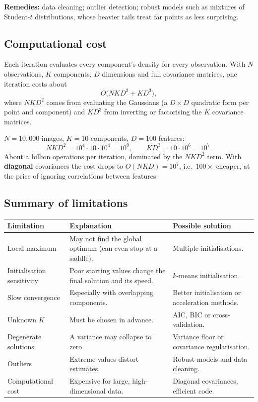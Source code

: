 \documentclass[11pt,a4paper]{article}
\begin{document}
\textbf{Remedies:} data cleaning; outlier detection; robust models such as mixtures of Student-$t$ distributions, whose heavier tails treat far points as less surprising.

\subsection{Computational cost}

Each iteration evaluates every component's density for every observation. With $N$ observations, $K$ components, $D$ dimensions and full covariance matrices, one iteration costs about
\[
O\big(NKD^2+KD^3\big),
\]
where $NKD^2$ comes from evaluating the Gaussians (a $D\times D$ quadratic form per point and component) and $KD^3$ from inverting or factorising the $K$ covariance matrices.

\begin{example}
$N=10{,}000$ images, $K=10$ components, $D=100$ features:
\[
NKD^2=10^4\cdot10\cdot10^4=10^9,\qquad KD^3=10\cdot10^6=10^7.
\]
About a billion operations per iteration, dominated by the $NKD^2$ term. With \textbf{diagonal} covariances the cost drops to $O(NKD)=10^7$, i.e.\ $100\times$ cheaper, at the price of ignoring correlations between features.
\end{example}

\subsection{Summary of limitations}

\begin{center}
\renewcommand{\arraystretch}{1.2}
\begin{tabular}{@{}p{3.1cm}p{6cm}p{5.6cm}@{}}
\toprule
Limitation & Explanation & Possible solution\\
\midrule
Local maximum & May not find the global optimum (can even stop at a saddle). & Multiple initialisations.\\
Initialisation sensitivity & Poor starting values change the final solution and its speed. & $k$-means initialisation.\\
Slow convergence & Especially with overlapping components. & Better initialisation or acceleration methods.\\
Unknown $K$ & Must be chosen in advance. & AIC, BIC or cross-validation.\\
Degenerate solutions & A variance may collapse to zero. & Variance floor or covariance regularisation.\\
Outliers & Extreme values distort estimates. & Robust models and data cleaning.\\
Computational cost & Expensive for large, high-dimensional data. & Diagonal covariances, efficient code.\\
\bottomrule
\end{tabular}
\end{center}
\end{document}
